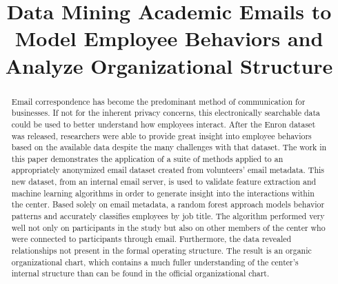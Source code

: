 \documentclass[10pt,twocolumn,conference]{IEEEtran}
\begin{document}
    
\setlength\belowdisplayskip{1.5pt}
\setlength\abovedisplayskip{1.5pt}
\allowdisplaybreaks

	\sloppy
    
    \title{Data Mining Academic Emails to Model Employee Behaviors and Analyze Organizational Structure\vspace{-7.5pt}}
    \author{
        \vspace{-25pt} }
    
\maketitle

\begin{abstract}
Email correspondence has become the predominant method of communication for businesses.
If not for the inherent privacy concerns, this electronically searchable data could be used to better understand how employees interact.
After the Enron dataset was released, researchers were able to provide great insight into employee behaviors based on the available data despite the many challenges with that dataset.
The work in this paper demonstrates the application of a suite of methods applied to an appropriately anonymized email dataset created from volunteers' email metadata.
This new dataset, from an internal email server, is used to validate feature extraction and machine learning algorithms in order to generate insight into the interactions within the center.
Based solely on email metadata, a random forest approach models behavior patterns and accurately classifies employees by job title.
The algorithm performed very well not only on participants in the study but also on other members of the center who were connected to participants through email.
Furthermore, the data revealed relationships not present in the formal operating structure.
The result is an organic organizational chart, which contains a much fuller understanding of the center's internal structure than can be found in the official organizational chart.
\end{abstract}
\end{document}

